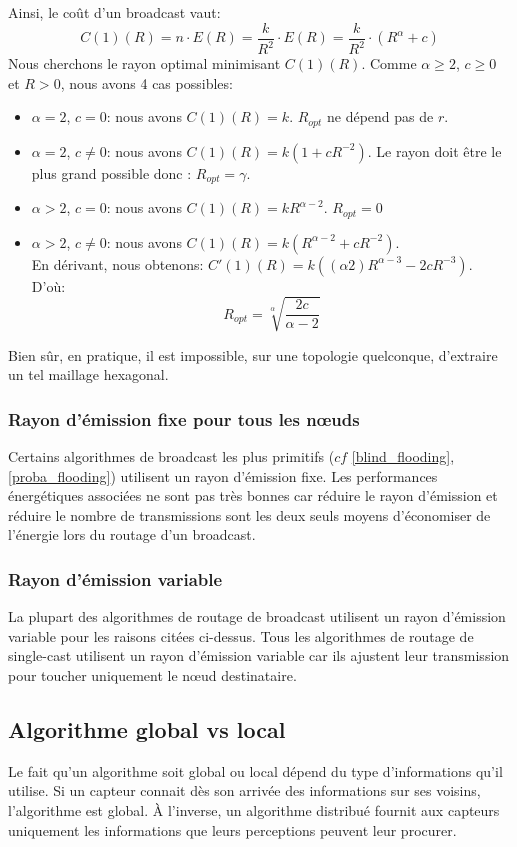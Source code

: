 Ainsi, le coût d'un broadcast vaut: $$C(1)(R)= n\cdot E(R)=\frac{k}{R^2}\cdot E(R)=\frac{k}{R^2}\cdot (R^\alpha+c)$$
Nous cherchons le rayon optimal minimisant $C(1)(R)$. Comme $\alpha\geq 2$, $c\geq 0$ et $R>0$, nous avons 4 cas possibles:
\begin{itemize}
 \item $\alpha=2$, $c=0$: nous avons $C(1)(R)=k$. $R_{opt}$ ne dépend pas de $r$.
 \item $\alpha=2$, $c\neq0$: nous avons $C(1)(R)=k(1+cR^{-2})$. Le rayon doit être le plus grand possible donc : $R_{opt}=\gamma$.
 \item $\alpha>2$, $c=0$: nous avons $C(1)(R)=kR^{\alpha-2}$. $R_{opt}=0$
 \item $\alpha>2$, $c\neq 0$: nous avons $C(1)(R)=k(R^{\alpha-2} + c R^{-2} ) $.\\
 En dérivant, nous obtenons: $C'(1)(R)= k( (\alpha 2) R^{\alpha-3}- 2cR^{-3} ) $.\\
D'où: $$R_{opt}=\sqrt[\alpha]{\frac{2c}{\alpha-2}}$$
\end{itemize}

Bien sûr, en pratique, il est impossible, sur une topologie quelconque, d'extraire un tel maillage hexagonal.


\subsubsection{Rayon d'émission fixe pour tous les nœuds}
Certains algorithmes de broadcast les plus primitifs ($cf$ \ref{blind_flooding}, \ref{proba_flooding}) utilisent un rayon d'émission fixe. Les performances énergétiques associées ne sont pas très bonnes car réduire le rayon d'émission et réduire le nombre de transmissions sont les deux seuls moyens d'économiser de l'énergie lors du routage d'un broadcast.


\subsubsection{Rayon d'émission variable}
La plupart des algorithmes de routage de broadcast utilisent un rayon d'émission variable pour les raisons citées ci-dessus. Tous les algorithmes de routage de single-cast utilisent un rayon d'émission variable car ils ajustent leur transmission pour toucher uniquement le nœud destinataire.



\subsection{Algorithme global vs local}
Le fait qu'un algorithme soit global ou local dépend du type d'informations qu'il utilise. Si un capteur connait dès son arrivée des informations sur ses voisins, l'algorithme est global. À l'inverse, un algorithme distribué fournit aux capteurs uniquement les informations que leurs perceptions peuvent leur procurer.


